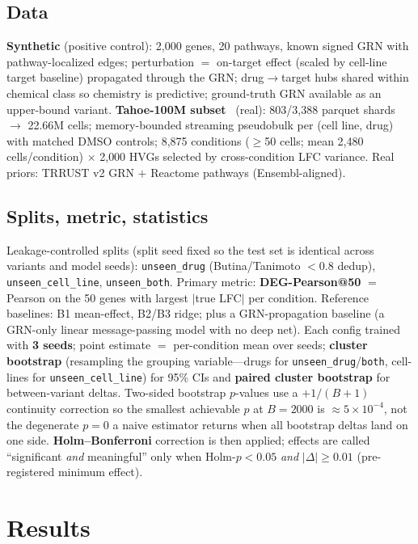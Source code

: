 \documentclass[11pt]{article}
\begin{document}
\subsection{Data}
\textbf{Synthetic} (positive control): 2{,}000 genes, 20 pathways, known signed GRN with
pathway-localized edges; perturbation $=$ on-target effect (scaled by cell-line target baseline)
propagated through the GRN; drug$\rightarrow$target hubs shared within chemical class so chemistry is
predictive; ground-truth GRN available as an upper-bound variant.
\textbf{Tahoe-100M subset}~\cite{tahoe100m} (real): 803/3{,}388 parquet shards $\rightarrow$ 22.66M
cells; memory-bounded streaming pseudobulk per (cell line, drug) with matched DMSO controls; 8{,}875
conditions ($\ge$50 cells; mean 2{,}480 cells/condition) $\times$ 2{,}000 HVGs selected by
cross-condition LFC variance. Real priors: TRRUST v2 GRN $+$ Reactome pathways (Ensembl-aligned).

\subsection{Splits, metric, statistics}
Leakage-controlled splits (split seed fixed so the test set is identical across variants and model
seeds): \texttt{unseen\_drug} (Butina/Tanimoto $<0.8$ dedup), \texttt{unseen\_cell\_line},
\texttt{unseen\_both}. Primary metric: \textbf{DEG-Pearson@50} $=$ Pearson on the 50 genes with largest
$|$true LFC$|$ per condition. Reference baselines: B1 mean-effect, B2/B3 ridge; plus a GRN-propagation
baseline (a GRN-only linear message-passing model with no deep net). Each config trained with
\textbf{3 seeds}; point estimate $=$ per-condition mean over seeds; \textbf{cluster bootstrap}
(resampling the grouping variable---drugs for \texttt{unseen\_drug}/\texttt{both}, cell-lines for
\texttt{unseen\_cell\_line}) for 95\% CIs and \textbf{paired cluster bootstrap} for between-variant
deltas. Two-sided bootstrap $p$-values use a $+1/(B+1)$ continuity correction so the smallest
achievable $p$ at $B\!=\!2000$ is $\approx\!5\times10^{-4}$, not the degenerate $p\!=\!0$ a naive
estimator returns when all bootstrap deltas land on one side. \textbf{Holm--Bonferroni} correction
is then applied; effects are called ``significant \emph{and} meaningful'' only when Holm-$p<0.05$
\emph{and} $|\Delta|\ge0.01$ (pre-registered minimum effect).

\section{Results}
\end{document}
